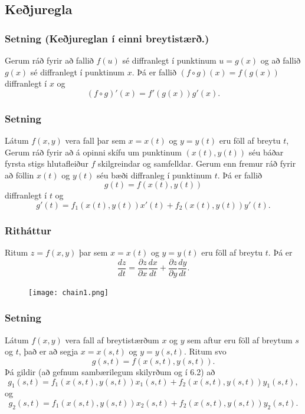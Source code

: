 


\subsection{Keðjuregla} 

\subsubsection{Setning  (Keðjureglan í einni breytistærð.)}
 Gerum ráð fyrir að fallið $f(u)$ sé diffranlegt í punktinum $u=g(x)$ og að fallið $g(x)$ sé diffranlegt í punktinum $x$.  Þá er fallið $(f\circ g)(x)=f(g(x))$ diffranlegt í $x$ og 
$$(f\circ g)'(x)=f'(g(x))g'(x).$$


\subsubsection{Setning }
Látum $f(x,y)$ vera fall þar sem $x=x(t)$ og $y=y(t)$ eru föll af breytu $t$,  Gerum ráð fyrir að á opinni skífu um  punktinum $(x(t),y(t))$ séu báðar fyrsta stigs hlutafleiður $f$ skilgreindar og samfelldar.   Gerum enn fremur ráð fyrir að föllin $x(t)$ og $y(t)$ séu bæði diffranleg í punktinum $t$.  Þá er fallið 
$$g(t)=f(x(t),y(t))$$
diffranlegt í $t$ og 
$$g'(t)=f_1(x(t),y(t))x'(t)+f_2(x(t),y(t))y'(t).$$



\subsubsection{Ritháttur }

Ritum $z=f(x,y)$ þar sem $x=x(t)$ og $y=y(t)$ eru föll af breytu $t$.  Þá er 
$$\frac{dz}{dt}=\frac{\partial z}{\partial x}\frac{dx}{dt}
+\frac{\partial z}{\partial y}\frac{dy}{dt}.$$

 \begin{figure}[h!]
           \centering
            \texttt{[image: chain1.png]}
	\caption*{}
    \end{figure}


\subsubsection{Setning }
 Látum $f(x,y)$ vera fall af breytistærðum $x$ og $y$ sem aftur eru föll af breytum $s$ og $t$, það er að segja 
$x=x(s,t)$ og $y=y(s,t)$.  Ritum svo 
$$g(s,t)=f(x(s,t),y(s,t)).$$
Þá gildir (að gefnum sambærilegum skilyrðum og í 6.2) að
$$g_1(s,t)=f_1(x(s,t),y(s,t))x_1(s,t)+f_2(x(s,t),y(s,t))y_1(s,t),$$
og 
$$g_2(s,t)=f_1(x(s,t),y(s,t))x_2(s,t)+f_2(x(s,t),y(s,t))y_2(s,t).$$



